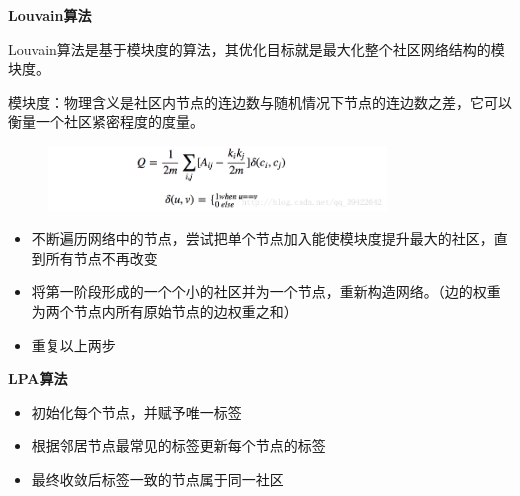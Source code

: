 \begin{frame}
	\textbf{Louvain算法}
	
	Louvain算法是基于模块度的算法，其优化目标就是最大化整个社区网络结构的模块度。
	
	模块度：物理含义是社区内节点的连边数与随机情况下节点的连边数之差，它可以衡量一个社区紧密程度的度量。
	
	\begin{figure}[htbp]
		\centering
		\includegraphics[width=0.8\textwidth]{pic/Louvain.png}
	\end{figure}

	\begin{itemize}
		\item 不断遍历网络中的节点，尝试把单个节点加入能使模块度提升最大的社区，直到所有节点不再改变 
		\item 将第一阶段形成的一个个小的社区并为一个节点，重新构造网络。（边的权重为两个节点内所有原始节点的边权重之和）
		\item 重复以上两步
	\end{itemize}
\end{frame}

\begin{frame}
	\textbf{LPA算法}
	
	\begin{itemize}
		\item 初始化每个节点，并赋予唯一标签 
		\item 根据邻居节点最常见的标签更新每个节点的标签 
		\item 最终收敛后标签一致的节点属于同一社区
	\end{itemize}
\end{frame}
